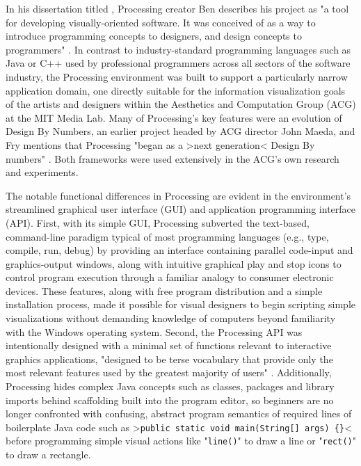 In his dissertation titled , Processing creator Ben \citeauthor{Fry2004} describes his project as "a tool for developing visually-oriented software. It was conceived of as a way to introduce programming concepts to designers, and design concepts to programmers" \autocite[123]{Fry2004}. In contrast to industry-standard programming languages such as Java or C++ used by professional programmers across all sectors of the software industry, the Processing environment was built to support a particularly narrow application domain, one directly suitable for the information visualization goals of the artists and designers within the Aesthetics and Computation Group (ACG) at the MIT Media Lab. Many of Processing's key features were an evolution of Design By Numbers, an earlier project headed by ACG director John Maeda, and Fry mentions that Processing "began as a >next generation< Design By numbers" \autocite[125]{Fry2004}. Both frameworks were used extensively in the ACG's own research and experiments.

The notable functional differences in Processing are evident in the environment's streamlined graphical user interface (GUI) and application programming interface (API). First, with its simple GUI, Processing subverted the text-based, command-line paradigm typical of most programming languages (e.g., type, compile, run, debug) by providing an interface containing parallel code-input and graphics-output windows, along with intuitive graphical play and stop icons to control program execution through a familiar analogy to consumer electronic devices. These features, along with free program distribution and a simple installation process, made it possible for visual designers to begin scripting simple visualizations without demanding knowledge of computers beyond familiarity with the Windows operating system. Second, the Processing API was intentionally designed with a minimal set of functions relevant to interactive graphics applications, "designed to be terse vocabulary that provide only the most relevant features used by the greatest majority of users" \autocite[129]{Fry2004}. Additionally, Processing hides complex Java concepts such as classes, packages and library imports behind scaffolding built into the program editor, so beginners are no longer confronted with confusing, abstract program semantics of required lines of boilerplate Java code such as >\texttt{public static void main(String[] args) \{\}}< before programming simple visual actions like "\texttt{line()}" to draw a line or "\texttt{rect()}" to draw a rectangle.

